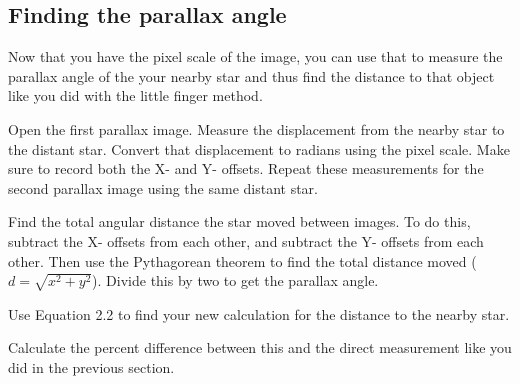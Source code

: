 \subsection{Finding the parallax angle}

Now that you have the pixel scale of the image, you can use that to measure the parallax angle of the your nearby star and thus find the distance to that object like you did with the little finger method.

\begin{steps}
	\item Open the first parallax image. Measure the displacement from the nearby star to the distant star. Convert that displacement to radians using the pixel scale. Make sure to record both the X- and Y- offsets. Repeat these measurements for the second parallax image using the same distant star.

	\item Find the total angular distance the star moved between images. To do this, subtract the X- offsets from each other, and subtract the Y- offsets from each other. Then use the Pythagorean theorem to find the total distance moved ($d = \sqrt{x^2 + y^2}$). Divide this by two to get the parallax angle.
	
	\item Use Equation 2.2 to find your new calculation for the distance to the nearby star.
	
	\item Calculate the percent difference between this and the direct measurement like you did in the previous section.
\end{steps}


